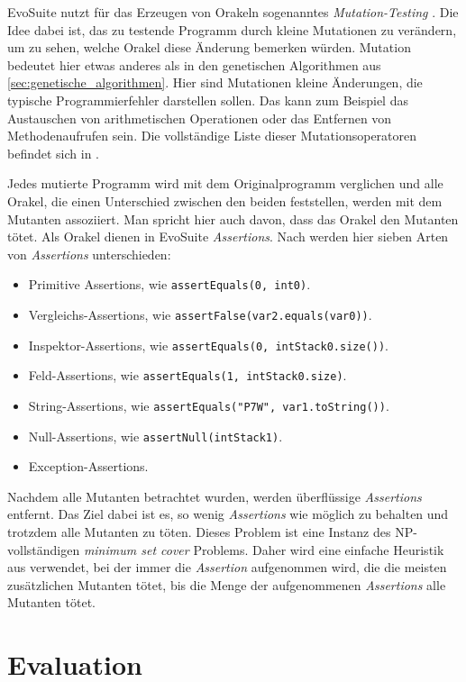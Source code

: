 \documentclass[a4paper,11pt]{article}
\begin{document}
EvoSuite nutzt für das Erzeugen von Orakeln sogenanntes \textit{Mutation-Testing} \cite{TSE12_Mutation, emse14_mutation}.
Die Idee dabei ist, das zu testende Programm durch kleine Mutationen zu verändern, um zu sehen, welche Orakel diese Änderung bemerken würden.
Mutation bedeutet hier etwas anderes als in den genetischen Algorithmen aus \cref{sec:genetische_algorithmen}.
Hier sind Mutationen kleine Änderungen, die typische Programmierfehler darstellen sollen.
Das kann zum Beispiel das Austauschen von arithmetischen Operationen oder das Entfernen von Methodenaufrufen sein.
Die vollständige Liste dieser Mutationsoperatoren befindet sich in \cite{emse14_mutation}.

Jedes mutierte Programm wird mit dem Originalprogramm verglichen und alle Orakel, die einen Unterschied zwischen den beiden feststellen, werden mit dem Mutanten assoziiert.
Man spricht hier auch davon, dass das Orakel den Mutanten tötet.
Als Orakel dienen in EvoSuite \textit{Assertions}.
Nach \citep{TSE12_Mutation} werden hier sieben Arten von \textit{Assertions} unterschieden:
\begin{itemize}
	\item Primitive Assertions, wie \lstinline{assertEquals(0, int0)}.
	\item Vergleichs-Assertions, wie \lstinline{assertFalse(var2.equals(var0))}.
	\item Inspektor-Assertions, wie \lstinline{assertEquals(0, intStack0.size())}.
	\item Feld-Assertions, wie \lstinline{assertEquals(1, intStack0.size)}.
	\item String-Assertions, wie \lstinline{assertEquals("P7W", var1.toString())}.
	\item Null-Assertions, wie \lstinline{assertNull(intStack1)}.
	\item Exception-Assertions.
\end{itemize}
Nachdem alle Mutanten betrachtet wurden, werden überflüssige \textit{Assertions} entfernt.
Das Ziel dabei ist es, so wenig \textit{Assertions} wie möglich zu behalten und trotzdem alle Mutanten zu töten.
Dieses Problem ist eine Instanz des NP-vollständigen \textit{minimum set cover} Problems.
Daher wird eine einfache Heuristik aus \cite{chvatal1979greedy} verwendet, bei der immer die \textit{Assertion} aufgenommen wird, die die meisten zusätzlichen Mutanten tötet, bis die Menge der aufgenommenen \textit{Assertions} alle Mutanten tötet.

\section{Evaluation}
\end{document}
